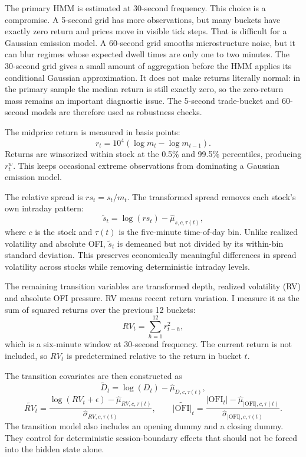 \documentclass[12pt,a4paper]{article}
\newcommand{\OFI}{\mathrm{OFI}}
\begin{document}
The primary HMM is estimated at 30-second frequency. This choice is a compromise. A 5-second grid has more observations, but many buckets have exactly zero return and prices move in visible tick steps. That is difficult for a Gaussian emission model. A 60-second grid smooths microstructure noise, but it can blur regimes whose expected dwell times are only one to two minutes. The 30-second grid gives a small amount of aggregation before the HMM applies its conditional Gaussian approximation. It does not make returns literally normal: in the primary sample the median return is still exactly zero, so the zero-return mass remains an important diagnostic issue. The 5-second trade-bucket and 60-second models are therefore used as robustness checks.

The midprice return is measured in basis points:
\[
r_t=10^4(\log m_t-\log m_{t-1}).
\]
Returns are winsorized within stock at the 0.5\% and 99.5\% percentiles, producing \(r_t^{w}\). This keeps occasional extreme observations from dominating a Gaussian emission model.

The relative spread is \(rs_t=s_t/m_t\). The transformed spread removes each stock's own intraday pattern:
\[
\tilde{s}_t = \log(rs_t)-\widehat{\mu}_{s,c,\tau(t)},
\]
where \(c\) is the stock and \(\tau(t)\) is the five-minute time-of-day bin. Unlike realized volatility and absolute OFI, \(\tilde{s}_t\) is demeaned but not divided by its within-bin standard deviation. This preserves economically meaningful differences in spread volatility across stocks while removing deterministic intraday levels.

The remaining transition variables are transformed depth, realized volatility (RV)  and absolute OFI pressure. RV means recent return variation. I measure it as the sum of squared returns over the previous 12 buckets:
\[
RV_t=\sum_{h=1}^{12} r_{t-h}^2,
\]
which is a six-minute window at 30-second frequency. The current return is not included, so \(RV_t\) is predetermined relative to the return in bucket \(t\).

The transition covariates are then constructed as
\[
\tilde{D}_t=\log(D_t)-\widehat{\mu}_{D,c,\tau(t)},
\]
\[
\widetilde{RV}_t=
\frac{\log(RV_t+\epsilon)-\widehat{\mu}_{RV,c,\tau(t)}}
{\widehat{\sigma}_{RV,c,\tau(t)}},
\qquad
\widetilde{|\OFI|}_t=
\frac{|\OFI_t|-\widehat{\mu}_{|\OFI|,c,\tau(t)}}
{\widehat{\sigma}_{|\OFI|,c,\tau(t)}}.
\]
The transition model also includes an opening dummy and a closing dummy. They control for deterministic session-boundary effects that should not be forced into the hidden state alone.
\end{document}
